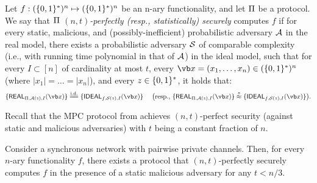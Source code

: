 \begin{definition}\label{def:MPC}
Let $f:(\{0,1\}^*)^n \mapsto (\{0,1\}^*)^n$ be an n-ary functionality, and let $\mathrm{\Pi}$ be a protocol. We say that $\mathrm{\Pi}$ {\em $(n,t)$-perfectly (resp., statistically) securely} computes $f$ if for every static, malicious, and (possibly-inefficient) probabilistic adversary $\mathcal{A}$ in the real model, there exists a probabilistic adversary $\mathcal{S}$ of comparable complexity (i.e., with running time polynomial in that of $\mathcal{A}$) in the ideal model, such that for every $I \subset [n]$ of cardinality at most $t$, every $\vec{x} = (x_1,\dots,x_n) \in (\Set{0,1}^*)^n$ (where $|x_1|=\dots=|x_n|$), and every $z \in \{0,1\}^*$, it holds that: 
$$\Set{\REAL_{\Prot,\Adv(z),I}(\vec{x})} \idind \Set{\IDEAL_{f,\Sim(z),I}(\vec{x})} ~~~~\big(\text{resp.,}~\Set{\REAL_{\Prot,\Adv(z),I}(\vec{x})} \sind \Set{\IDEAL_{f,\Sim(z),I}(\vec{x})}\big).$$   
\end{definition}
Recall that the MPC protocol from \cite{STOC:BenGolWig88} achieves $(n,t)$-perfect security (against static and malicious adversaries) with $t$ being a constant fraction of $n$.
\begin{theorem}\label{thm:BGW88}
Consider a synchronous network  with  pairwise  private  channels. Then,  for every $n$-ary functionality $f$, there exists a protocol that $(n,t)$-perfectly securely computes $f$ in the presence of a static malicious adversary for any $t < n/3$.
\end{theorem}

